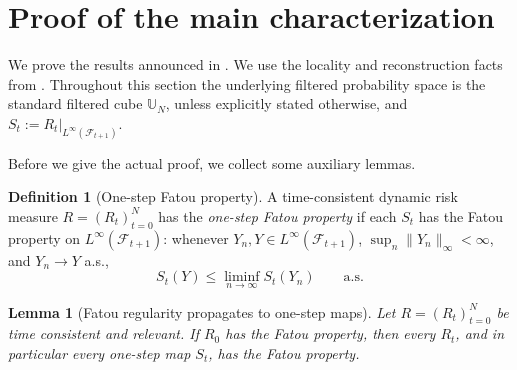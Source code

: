 \documentclass[a4paper]{amsart}
\newtheorem{lemma}[lemma]{Lemma}
\theoremstyle{definition}
\newtheorem{definition}[definition]{Definition}
\newcommand{\F}{\mathcal{F}}
\begin{document}


\section{Proof of the main characterization}
\label{sec:dynamic}

We prove the results announced in . We use
the locality and reconstruction facts from
.
Throughout this section the underlying filtered probability space is the
standard filtered cube \(\mathbb U_N\), unless explicitly stated otherwise, and
\(S_t:=R_t|_{L^\infty(\F_{t+1})}\).

Before we give the actual proof, we collect some auxiliary lemmas. 



\begin{definition}[One-step Fatou property]
\label{def:one-step-fatou}
A time-consistent dynamic risk measure \(R=(R_t)_{t=0}^N\) has the
\emph{one-step Fatou property} if each \(S_t\) has the Fatou property on
\(L^\infty(\F_{t+1})\): whenever \(Y_n,Y\in L^\infty(\F_{t+1})\),
\(\sup_n\|Y_n\|_\infty<\infty\), and \(Y_n\to Y\) a.s.,
\[
S_t(Y)\le\liminf_{n\to\infty}S_t(Y_n)
\qquad\text{a.s.}
\]
\end{definition}


\begin{lemma}[Fatou regularity propagates to one-step maps]
\label{lem:R0-fatou-implies-one-step-fatou}
Let \(R=(R_t)_{t=0}^N\) be time consistent and relevant. If \(R_0\) has the
Fatou property, then every \(R_t\), and in particular every one-step map
\(S_t\), has the Fatou property.
\end{lemma}
\end{document}
